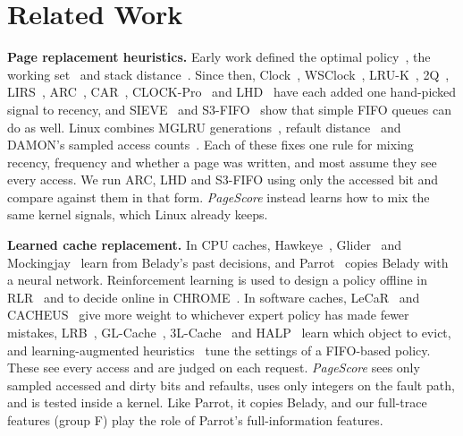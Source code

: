 \documentclass{article}
\newcommand{\clock}{Clock\xspace}
\newcommand{\belady}{Belady\xspace}
\DeclareRobustCommand{\pagescore}{\textit{PageScore}}
\newcommand{\tierF}{\textsf{F}\xspace}
\newcommand{\finding}[1]{\textbf{#1}\hspace{0.4em}}
\begin{document}
\section{Related Work}
\label{sec:related}

\finding{Page replacement heuristics.} Early work defined the optimal policy~\citep{belady1966study}, the working set~\citep{denning1968working} and stack distance~\citep{mattson1970evaluation}. Since then, \clock~\citep{corbato1968paging}, WSClock~\citep{carr1981wsclock}, LRU-K~\citep{oneil1993lruk}, 2Q~\citep{johnson1994twoq}, LIRS~\citep{jiang2002lirs}, ARC~\citep{megiddo2003arc}, CAR~\citep{bansal2004car}, CLOCK-Pro~\citep{jiang2005clockpro} and LHD~\citep{beckmann2018lhd} have each added one hand-picked signal to recency, and SIEVE~\citep{zhang2024sieve} and S3-FIFO~\citep{yang2023s3fifo} show that simple FIFO queues can do as well. Linux combines MGLRU generations~\citep{linux_mglru}, refault distance~\citep{linux_workingset} and DAMON's sampled access counts~\citep{linux_damon}. Each of these fixes one rule for mixing recency, frequency and whether a page was written, and most assume they see every access. We run ARC, LHD and S3-FIFO using only the accessed bit and compare against them in that form. \pagescore{} instead learns how to mix the same kernel signals, which Linux already keeps.

\finding{Learned cache replacement.} In CPU caches, Hawkeye~\citep{jain2016hawkeye}, Glider~\citep{shi2019glider} and Mockingjay~\citep{shah2022mockingjay} learn from \belady's past decisions, and Parrot~\citep{liu2020parrot} copies \belady with a neural network. Reinforcement learning is used to design a policy offline in RLR~\citep{sethumurugan2021rlr} and to decide online in CHROME~\citep{lu2024chrome}. In software caches, LeCaR~\citep{vietri2018lecar} and CACHEUS~\citep{rodriguez2021cacheus} give more weight to whichever expert policy has made fewer mistakes, LRB~\citep{song2020lrb}, GL-Cache~\citep{yang2023glcache}, 3L-Cache~\citep{zhou2025threelcache} and HALP~\citep{song2023halp} learn which object to evict, and learning-augmented heuristics~\citep{xia2026lah} tune the settings of a FIFO-based policy. These see every access and are judged on each request. \pagescore{} sees only sampled accessed and dirty bits and refaults, uses only integers on the fault path, and is tested inside a kernel. Like Parrot, it copies \belady, and our full-trace features (group \tierF) play the role of Parrot's full-information features.
\end{document}
